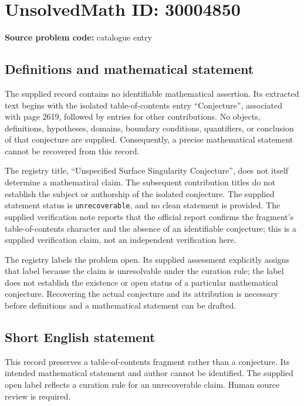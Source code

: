\documentclass[11pt]{article}
\begin{document}
\section*{UnsolvedMath ID: 30004850}
\textbf{Source problem code:} catalogue entry
\subsection{Definitions and mathematical statement}
The supplied record contains no identifiable mathematical assertion. Its extracted text begins with the isolated table-of-contents entry ``Conjecture'', associated with page 2619, followed by entries for other contributions. No objects, definitions, hypotheses, domains, boundary conditions, quantifiers, or conclusion of that conjecture are supplied. Consequently, a precise mathematical statement cannot be recovered from this record.

The registry title, ``Unspecified Surface Singularity Conjecture'', does not itself determine a mathematical claim. The subsequent contribution titles do not establish the subject or authorship of the isolated conjecture. The supplied statement status is \texttt{unrecoverable}, and no clean statement is provided. The supplied verification note reports that the official report confirms the fragment's table-of-contents character and the absence of an identifiable conjecture; this is a supplied verification claim, not an independent verification here.

The registry labels the problem open. Its supplied assessment explicitly assigns that label because the claim is unresolvable under the curation rule; the label does not establish the existence or open status of a particular mathematical conjecture. Recovering the actual conjecture and its attribution is necessary before definitions and a mathematical statement can be drafted.
\subsection{Short English statement}
This record preserves a table-of-contents fragment rather than a conjecture. Its intended mathematical statement and author cannot be identified. The supplied open label reflects a curation rule for an unrecoverable claim. Human source review is required.
\end{document}
